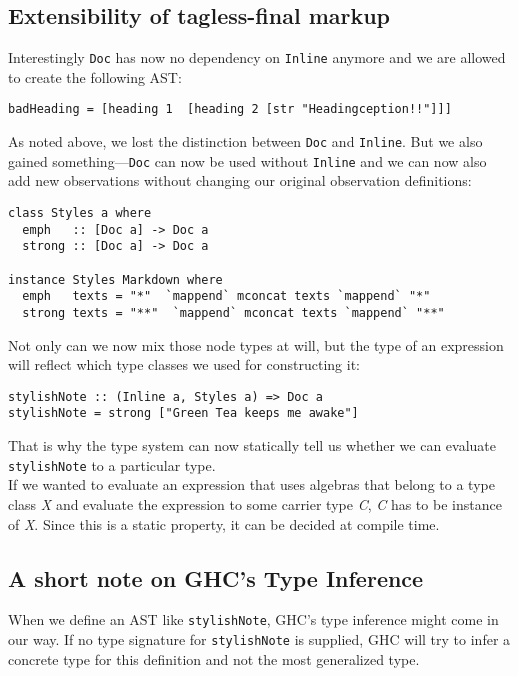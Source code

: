 \subsection{Extensibility of tagless-final markup}

Interestingly \texttt{Doc} has now no dependency on \texttt{Inline} anymore and
we are allowed to create the following AST:

\begin{lstlisting}
badHeading = [heading 1  [heading 2 [str "Headingception!!"]]]
\end{lstlisting}

As noted above, we lost the distinction between \texttt{Doc} and
\texttt{Inline}. But we also gained something—\texttt{Doc} can now be used
without \texttt{Inline} and we can now also add new observations without
changing our original observation definitions:

\begin{lstlisting}
class Styles a where
  emph   :: [Doc a] -> Doc a
  strong :: [Doc a] -> Doc a

instance Styles Markdown where
  emph   texts = "*"  `mappend` mconcat texts `mappend` "*"
  strong texts = "**"  `mappend` mconcat texts `mappend` "**"
\end{lstlisting}

\pagebreak

Not only can we now mix those node types at will, but the type of an expression
will reflect which type classes we used for constructing it:

\begin{lstlisting}
stylishNote :: (Inline a, Styles a) => Doc a
stylishNote = strong ["Green Tea keeps me awake"]
\end{lstlisting}

That is why the type system can now statically tell us whether we can evaluate
\texttt{stylishNote} to a particular type.\\
If we wanted to evaluate an
expression that uses algebras that belong to a type class \emph{X} and evaluate
the expression to some carrier type \emph{C}, \emph{C} has to be instance of
\emph{X}. Since this is a static property, it can be decided at compile time.

\subsection{A short note on GHC’s Type Inference}

When we define an AST like \texttt{stylishNote}, GHC’s type inference might come
in our way. If no type signature for \texttt{stylishNote} is supplied, GHC will
try to infer a concrete type for this definition and not the most generalized
type.

